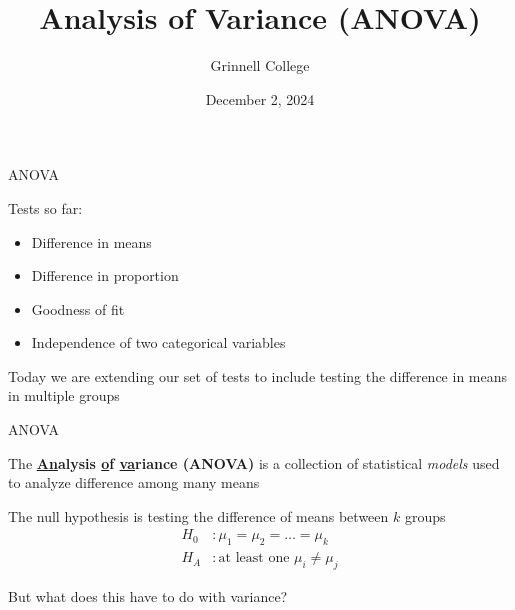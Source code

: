 \documentclass{beamer}
\title[Intro Statistics]{Analysis of Variance (ANOVA)}
\subtitle{}
\author{Grinnell College}
\date{December 2, 2024}
\begin{document}
\begin{frame}
  \titlepage
\end{frame}

\begin{frame}{ANOVA}

Tests so far:

\begin{itemize}
\item Difference in means
\item Difference in proportion
\item Goodness of fit
\item Independence of two categorical variables
\end{itemize}

\vspace{4mm}

Today we are extending our set of tests to include testing the difference in means in multiple groups

\end{frame}


\begin{frame}{ANOVA}

The \textbf{\underline{An}alysis \underline{o}f \underline{va}riance (ANOVA)} is a collection of statistical \textit{models} used to analyze difference among many means \vspace{6mm}

The null hypothesis is testing the difference of means between $k$ groups 
\begin{align*}
H_0&: \mu_1 = \mu_2 = \dots = \mu_k \\
H_A&: \text{at least one } \mu_i \not= \mu_j
\end{align*} \vspace{4mm}

But what does this have to do with variance?
\end{frame}
\end{document}
